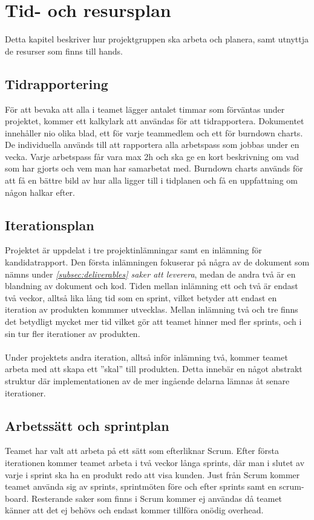 \section{Tid- och resursplan}
Detta kapitel beskriver hur projektgruppen ska arbeta och planera, samt utnyttja de resurser som finns till hands.

\subsection{Tidrapportering}
För att bevaka att alla i teamet lägger antalet timmar som förväntas under
projektet, kommer ett kalkylark\cite{bib-tidsrapportering} att användas för att tidrapportera. Dokumentet innehåller nio olika blad, ett för varje teammedlem och ett för 
burndown charts. De individuella används till att rapportera alla arbetspass som jobbas under 
en vecka. Varje arbetspass får vara max 2h och ska ge en kort beskrivning om vad som har gjorts 
och vem man har samarbetat med. Burndown charts används för att få en bättre bild av hur alla
ligger till i tidplanen och få en uppfattning om någon halkar efter.


\subsection{Iterationsplan}
Projektet är uppdelat i tre projektinlämningar samt en inlämning för kandidatrapport. Den första inlämningen fokuserar
på några av de dokument som nämns under \textit{\ref{subsec:deliverables} saker att leverera}, medan de andra två är en blandning av dokument och kod. Tiden mellan inlämning ett och två är endast två veckor, alltså lika lång tid som en sprint, vilket betyder att endast en iteration av produkten kommmer utvecklas. Mellan inlämning två och tre finns det betydligt mycket mer tid vilket gör att teamet hinner med fler sprints, och i sin tur fler iterationer av produkten.\\
\\
Under projektets andra iteration, alltså inför inlämning två, kommer teamet arbeta med att skapa ett ''skal'' till produkten. Detta innebär en något abstrakt struktur där implementationen av de mer ingående delarna lämnas åt senare iterationer.

\subsection{Arbetssätt och sprintplan}

Teamet har valt att arbeta på ett sätt som efterliknar Scrum\cite{bib-scrum}. Efter första iterationen kommer teamet arbeta i två veckor långa sprints, där man i slutet av varje i sprint ska ha en produkt redo att visa kunden. Just från Scrum kommer teamet använda sig av sprints, sprintmöten före och efter sprints samt en scrum-board. Resterande saker som finns i Scrum kommer ej användas då teamet känner att det ej behövs och endast kommer tillföra onödig overhead.\\
\\

